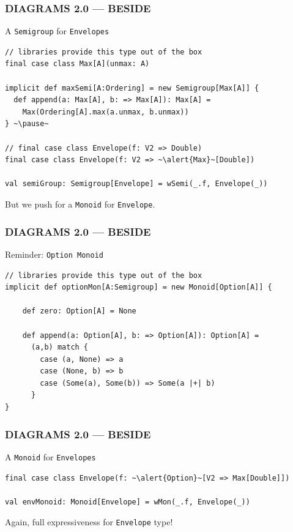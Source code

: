 \documentclass{beamer}
\begin{document}
\begin{frame}[fragile] \frametitle{DIAGRAMS 2.0 --- BESIDE}
  \begin{block}{A \texttt{Semigroup} for \texttt{Envelopes}}
  \begin{lstlisting}
// libraries provide this type out of the box
final case class Max[A](unmax: A)

implicit def maxSemi[A:Ordering] = new Semigroup[Max[A]] {
  def append(a: Max[A], b: => Max[A]): Max[A] =
    Max(Ordering[A].max(a.unmax, b.unmax))
} ~\pause~

// final case class Envelope(f: V2 => Double)
final case class Envelope(f: V2 => ~\alert{Max}~[Double])

val semiGroup: Semigroup[Envelope] = wSemi(_.f, Envelope(_))
  \end{lstlisting}
  \end{block}

  But we push for a \texttt{Monoid} for \texttt{Envelope}.
\end{frame}

\begin{frame}[fragile] \frametitle{DIAGRAMS 2.0 --- BESIDE}
  \begin{block}{Reminder: \texttt{Option Monoid}}
  \begin{lstlisting}
// libraries provide this type out of the box
implicit def optionMon[A:Semigroup] = new Monoid[Option[A]] {

    def zero: Option[A] = None

    def append(a: Option[A], b: => Option[A]): Option[A] =
      (a,b) match {
        case (a, None) => a
        case (None, b) => b
        case (Some(a), Some(b)) => Some(a |+| b)
      }
}
  \end{lstlisting}
  \end{block}
\end{frame}

\begin{frame}[fragile] \frametitle{DIAGRAMS 2.0 --- BESIDE}
  \begin{block}{A \texttt{Monoid} for \texttt{Envelopes}}
  \begin{lstlisting}
final case class Envelope(f: ~\alert{Option}~[V2 => Max[Double]])

val envMonoid: Monoid[Envelope] = wMon(_.f, Envelope(_))
  \end{lstlisting}
  \end{block}

Again, full expressiveness for \texttt{Envelope} type!
\end{frame}
\end{document}

